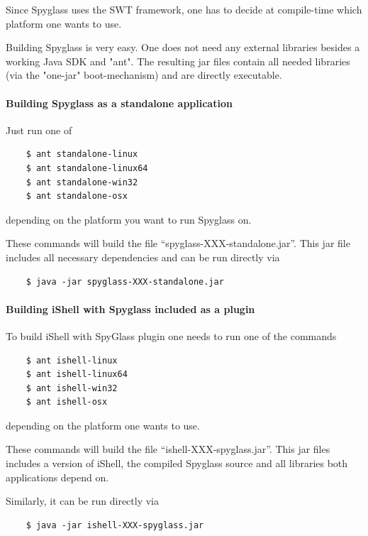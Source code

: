 Since Spyglass uses the SWT framework, one has to
decide at compile-time which platform one wants to use.

Building Spyglass is very easy. One does not need any external
libraries besides a working Java SDK and "ant".
The resulting jar files contain all needed libraries (via the
"one-jar" boot-mechanism) and are directly executable.


\paragraph{Building Spyglass as a standalone application}

Just run one of

\begin{verbatim}
    $ ant standalone-linux
    $ ant standalone-linux64
    $ ant standalone-win32
    $ ant standalone-osx
\end{verbatim}

depending on the platform you want to run Spyglass on.

These commands will build the file ``spyglass-XXX-standalone.jar''.
This jar file includes all necessary dependencies and can be run directly via

\begin{verbatim}
    $ java -jar spyglass-XXX-standalone.jar
\end{verbatim}

\paragraph{Building iShell with Spyglass included as a plugin}

To build iShell with SpyGlass plugin one needs to run one of the commands

\begin{verbatim}
    $ ant ishell-linux
    $ ant ishell-linux64
    $ ant ishell-win32
    $ ant ishell-osx
\end{verbatim}

depending on the platform one wants to use.

These commands will build the file ``ishell-XXX-spyglass.jar''.
This jar files includes a version of iShell, the compiled Spyglass source
and all libraries both applications depend on.

Similarly, it can be run directly via

\begin{verbatim}
    $ java -jar ishell-XXX-spyglass.jar
\end{verbatim}

